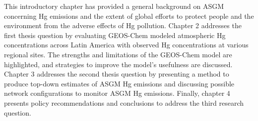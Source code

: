 \begin{flushleft}
  This introductory chapter has provided a general background on ASGM concerning Hg emissions and the extent of global efforts to protect people and the environment from the adverse effects of Hg pollution. Chapter 2 addresses the first thesis question by evaluating GEOS-Chem modeled atmospheric Hg concentrations across Latin America with observed Hg concentrations at various regional sites. The strengths and limitations of the GEOS-Chem model are highlighted, and strategies to improve the model's usefulness are discussed. Chapter 3 addresses the second thesis question by presenting a method to produce top-down estimates of ASGM Hg emissions and discussing possible network configurations to monitor ASGM Hg emissions. Finally, chapter 4 presents policy recommendations and conclusions to address the third research question.  
\end{flushleft}




